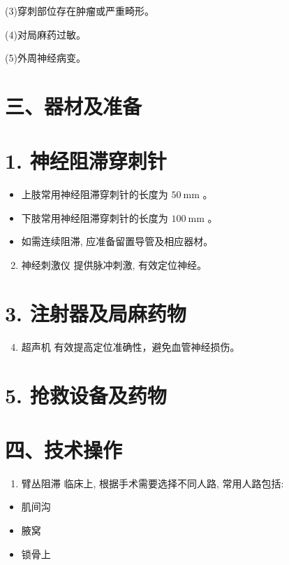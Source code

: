 \documentclass[10pt]{article}
\begin{document}
(3)穿刺部位存在肿瘤或严重畸形。

(4)对局麻药过敏。

(5)外周神经病变。

\section*{三、器材及准备}
\section*{1. 神经阻滞穿刺针}
\begin{itemize}
  \item 上肢常用神经阻滞穿刺针的长度为 $50 \mathrm{~mm}$ 。
  \item 下肢常用神经阻滞穿刺针的长度为 $100 \mathrm{~mm}$ 。
  \item 如需连续阻滞, 应准备留置导管及相应器材。
\end{itemize}

\begin{enumerate}
  \setcounter{enumi}{1}
  \item 神经刺激仪 提供脉冲刺激, 有效定位神经。
\end{enumerate}

\section*{3. 注射器及局麻药物}
\begin{enumerate}
  \setcounter{enumi}{3}
  \item 超声机 有效提高定位准确性，避免血管神经损伤。
\end{enumerate}

\section*{5. 抢救设备及药物}
\section*{四、技术操作}
\begin{enumerate}
  \item 臂丛阻滞 临床上, 根据手术需要选择不同人路, 常用人路包括:
\end{enumerate}

\begin{itemize}
  \item 肌间沟
  \item 腋窝
  \item 锁骨上
\end{itemize}
\end{document}
